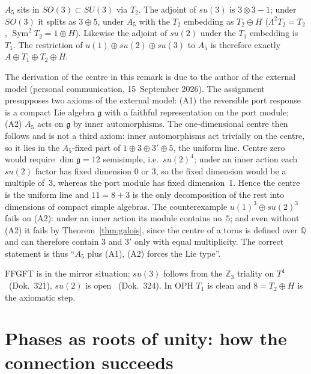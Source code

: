 \begin{theorem}
$A_5$ sits in $SO(3)\subset SU(3)$ via $T_2$. The adjoint of $su(3)$ is
$3\otimes\bar3-1$; under $SO(3)$ it splits as $3\oplus5$, under $A_5$ with
the $T_2$ embedding as $T_2\oplus H$ ($\Lambda^2T_2=T_2$,
$\operatorname{Sym}^2T_2=1\oplus H$). Likewise the adjoint of $su(2)$
under the $T_1$ embedding is $T_1$. The restriction of
$u(1)\oplus su(2)\oplus su(3)$ to $A_5$ is therefore exactly
$A\oplus T_1\oplus T_2\oplus H$.
\end{theorem}

\begin{remark}
The derivation of the centre in this remark is due to the author of the
external model (personal communication, 15~September 2026).
The assignment presupposes two axioms of the external model: (A1) the
reversible port response is a compact Lie algebra $\mathfrak{g}$ with a
faithful representation on the port module; (A2) $A_5$ acts on
$\mathfrak{g}$ by inner automorphisms. The one-dimensional centre then
follows and is not a third axiom: inner automorphisms act trivially on the
centre, so it lies in the $A_5$-fixed part of $1\oplus3\oplus3'\oplus5$,
the uniform line. Centre zero would require $\dim\mathfrak{g}=12$
semisimple, i.e.\ $su(2)^4$; under an inner action each $su(2)$ factor has
fixed dimension $0$ or $3$, so the fixed dimension would be a multiple
of~3, whereas the port module has fixed dimension~1. Hence the centre is
the uniform line and $11=8+3$ is the only decomposition of the rest into
dimensions of compact simple algebras. The counterexample
$u(1)^3\oplus su(2)^3$ fails on (A2): under an inner action its module
contains no~$5$; and even without (A2) it fails by
Theorem~\ref{thm:galois}, since the centre of a torus is defined over
$\mathbb{Q}$ and can therefore contain $3$ and $3'$ only with equal
multiplicity. The correct statement is thus \enquote{$A_5$ plus (A1), (A2)
forces the Lie type}.
\end{remark}

FFGFT is in the mirror situation: $su(3)$ follows from the $\mathbb{Z}_3$
triality on $T^4$ \BM\ (Dok.~321), $su(2)$ is open \SM\ (Dok.~324). In OPH
$T_1$ is clean and $8=T_2\oplus H$ is the axiomatic step.

\section{Phases as roots of unity: how the connection succeeds}\label{sec:phasen}

